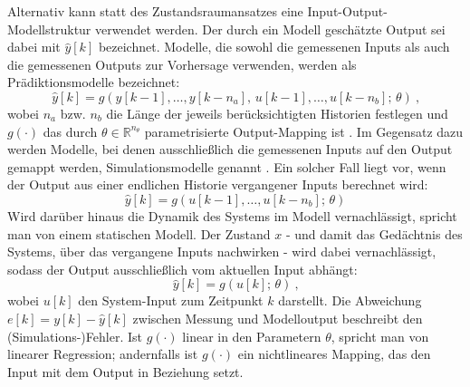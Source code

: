 \newline
Alternativ kann statt des Zustandsraumansatzes eine Input-Output-Modellstruktur verwendet werden. Der durch ein Modell geschätzte Output sei dabei mit $\hat{y}[k]$ bezeichnet. Modelle, die sowohl die gemessenen Inputs als auch die gemessenen Outputs zur Vorhersage verwenden, werden als Prädiktionsmodelle bezeichnet:
%
\begin{equation}
    \hat{y}[k] = g(y[k-1], \dots ,y[k-n_a],\,u[k-1], \dots ,u[k-n_b];\,\theta) \ \text{,}
    \label{eq:io_model}
\end{equation}
%
wobei $n_a$ bzw. $n_b$ die Länge der jeweils berücksichtigten Historien festlegen und $g(\cdot)$ das durch $\theta \in \mathbb{R}^{n_\theta}$ parametrisierte Output-Mapping ist \cite{forgione.2020}. Im Gegensatz dazu werden Modelle, bei denen ausschließlich die gemessenen Inputs auf den Output gemappt werden, Simulationsmodelle genannt \cite{forgione.2020}. Ein solcher Fall liegt vor, wenn der Output aus einer endlichen Historie vergangener Inputs berechnet wird:
%
\begin{equation} \label{eq:io_dynamic}
    \hat{y}[k] = g(u[k-1], \ldots, u[k-n_b];\,\theta)
\end{equation}
%
Wird darüber hinaus die Dynamik des Systems im Modell vernachlässigt, spricht man von einem statischen Modell. Der Zustand $x$ - und damit das Gedächtnis des Systems, über das vergangene Inputs nachwirken - wird dabei vernachlässigt, sodass der Output ausschließlich vom aktuellen Input abhängt:
%
\begin{equation} \label{eq:io_static}
    \hat{y}[k] = g(u[k];\,\theta)\ \text{,}
\end{equation}
%
wobei $u[k]$ den System-Input zum Zeitpunkt $k$ darstellt. Die Abweichung $e[k] = y[k] - \hat{y}[k]$ zwischen Messung und Modelloutput beschreibt den (Simulations-)Fehler. Ist $g(\cdot)$ linear in den Parametern $\theta$, spricht man von linearer Regression; andernfalls ist $g(\cdot)$ ein nichtlineares Mapping, das den Input mit dem Output in Beziehung setzt. \par
